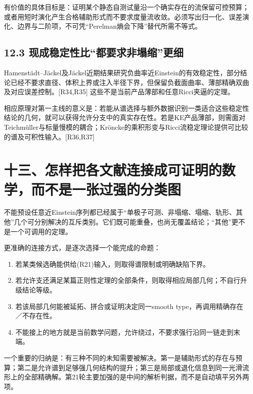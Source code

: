 \documentclass[
  11pt,
  a4paper,
  fontset=none]{ctexart}
\providecommand{\tightlist}{%
  \setlength{\itemsep}{0pt}\setlength{\parskip}{0pt}}
\begin{document}
有价值的具体目标是：证明某个静态自测试量沿一个确实存在的流保留可控预算；或者用短时演化产生合格辅助形式而不要求度量流收敛。必须写出归一化、误差演化、边界与二阶项，不可凭``Perelman熵会下降''替代所需不等式。

\subsection{12.3
现成稳定性比``都要求非塌缩''更细}\label{ux73b0ux6210ux7a33ux5b9aux6027ux6bd4ux90fdux8981ux6c42ux975eux584cux7f29ux66f4ux7ec6}

Hamenstädt--Jäckel及Jäckel近期结果研究负曲率近Einstein的有效稳定性，部分结论已经不要求直径、体积上界或注入半径下界，但保留负截面曲率、薄部精确双曲及对应误差控制。{[}R34,R35{]}
这些不是当前产品薄部和任意Ricci夹逼的定理。

相应原理对第一主线的意义是：若能从谱选择与额外数据识别一类适合这些稳定性结论的几何，就可以获得允许分支中的真实存在性。若是KE产品薄部，则需面对Teichmüller与标量慢模的耦合；Kröncke的乘积形变与Ricci流稳定理论提供可比较的谱及可积性输入。{[}R36,R37{]}

\section{十三、怎样把各文献连接成可证明的数学，而不是一张过强的分类图}\label{ux5341ux4e09ux600eux6837ux628aux5404ux6587ux732eux8fdeux63a5ux6210ux53efux8bc1ux660eux7684ux6570ux5b66ux800cux4e0dux662fux4e00ux5f20ux8fc7ux5f3aux7684ux5206ux7c7bux56fe}

不能预设任意近Einstein序列都已经属于``单极子可测、非塌缩、塌缩、轨形、其他''几个可分别解决的互斥类别。它们既可能重叠，也尚无覆盖结论；``其他''更不是一个可调用的定理。

更准确的连接方式，是逐次选择一个能完成的命题：

\begin{enumerate}
\def\labelenumi{\arabic{enumi}.}
\tightlist
\item
  若某类候选确能供给(R21)输入，则取得谱限制或明确缺陷下界。
\item
  若允许支还满足某篇正则性定理的全部条件，则取得相应局部几何；不自行升级结论等级。
\item
  若该局部几何能被延拓、拼合或证明决定同一smooth
  type，再调用精确存在／不存在性。
\item
  不能接上的地方就是当前数学问题，允许绕过，不要求强行沿同一链走到末端。
\end{enumerate}

一个重要的归纳是：有三种不同的未知需要被解决。第一是辅助形式的存在与预算；第二是允许谱到足够强几何结构的提升；第三是局部或退化信息到同一光滑流形上的全部精确解。第21轮主要加强的是中间的解析判据，而不是自动填平另外两项。
\end{document}
